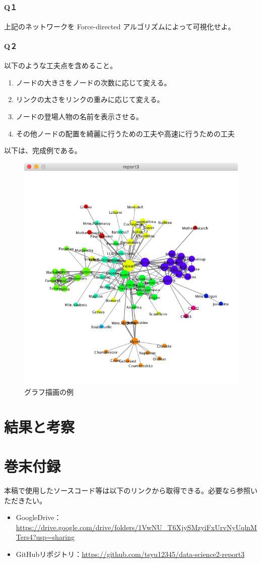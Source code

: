 \documentclass[dvipdfmx]{jsarticle}
\begin{document}
\paragraph{Q１}上記のネットワークを Force-directed アルゴリズムによって可視化せよ。
\paragraph{Q２}以下のような工夫点を含めること。
\begin{enumerate}
  \item ノードの大きさをノードの次数に応じて変える。
  \item リンクの太さをリンクの重みに応じて変える。
  \item ノードの登場人物の名前を表示させる。
  \item その他ノードの配置を綺麗に行うための工夫や高速に行うための工夫
\end{enumerate}
以下は、完成例である。
\begin{figure}[H]
  \centering
  \includegraphics[scale=0.6]{images/resultEx.png}
  \caption{グラフ描画の例}
\end{figure}
\section{結果と考察}
\section{巻末付録}
本稿で使用したソースコード等は以下のリンクから取得できる。必要なら参照いただきたい。
\begin{itemize}
  \item GoogleDrive：\url{https://drive.google.com/drive/folders/1VwNU_T6XjySMzyiFxUrvNyUqlnMTers4?usp=sharing}
  \item GitHubリポジトリ：\url{https://github.com/tsyu12345/data-science2-report3}
\end{itemize}
\end{document}

